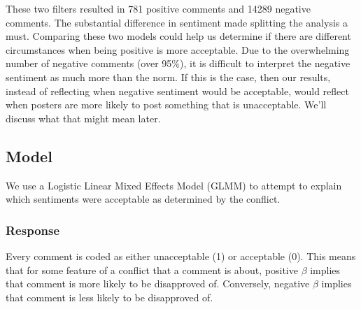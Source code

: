 These two filters resulted in 781 positive comments and 14289 negative comments. The substantial difference in sentiment made splitting the analysis a must. Comparing these two models could help us determine if there are different circumstances when being positive is more acceptable. Due to the overwhelming number of negative comments (over 95\%), it is difficult to interpret the negative sentiment as much more than the norm. If this is the case, then our results, instead of reflecting when negative sentiment would be acceptable, would reflect when posters are more likely to post something that is unacceptable. We'll discuss what that might mean later.

\subsection{Model}
We use a Logistic Linear Mixed Effects Model (GLMM) to attempt to explain which sentiments were acceptable as determined by the conflict.

\subsubsection{Response}
Every comment is coded as either unacceptable (1) or acceptable (0). This means that for some feature of a conflict that a comment is about, positive $\beta$ implies that comment is more likely to be disapproved of. Conversely, negative $\beta$ implies that comment is less likely to be disapproved of. 

